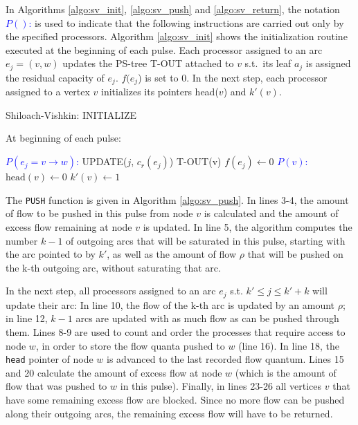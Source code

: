 \documentclass[a4paper,10pt, twocolumn]{article}
\begin{document}
In Algorithms \ref{algo:sv_init}, \ref{algo:sv_push} and \ref{algo:sv_return}, the notation \textcolor{blue}{$P()$:} is used to indicate that the following instructions are carried out only by the specified processors. Algorithm \ref{algo:sv_init} shows the initialization routine executed at the beginning of each pulse. Each processor assigned to an arc $e_j = (v, w)$ updates the PS-tree T-OUT attached to $v$ s.t.\ its leaf $a_j$ is assigned the residual capacity of $e_j$. $f(e_j$) is set to 0. In the next step, each processor assigned to a vertex $v$ initializes its pointers head($v$) and $k'(v)$.

\begin{algorithm}
\caption{Shiloach-Vishkin: INITIALIZE}
\label{algo:sv_init}
At beginning of each pulse:	
\begin{algorithmic}[1]
		\State \textcolor{blue}{$P(e_j = v \rightarrow w)$:}
		\State UPDATE($j$, $c_r(e_j)$) T-OUT(v)
		\State $f(e_j) \gets 0$
		\State \textcolor{blue}{$P(v)$:}
		\State $\mathrm{head}(v) \gets 0	$
		\State $k'(v) \gets 1$	
 	\EndFunction
\end{algorithmic}
\end{algorithm}

The \lstinline|PUSH| function is given in Algorithm \ref{algo:sv_push}. In lines 3-4, the amount of flow to be pushed in this pulse from node $v$ is calculated and the amount of excess flow remaining at node $v$ is updated. In line 5, the algorithm computes the number $k-1$ of outgoing arcs that will be saturated in this pulse, starting with the arc pointed to by $k'$, as well as the amount of flow $\rho$ that will be pushed on the k-th outgoing arc, without saturating that arc.

In the next step, all processors assigned to an arc $e_j$ s.t. $k'\leq j \leq k'+k$ will update their arc: In line 10, the flow of the k-th arc is updated by an amount $\rho$; in line 12, $k-1$ arcs are updated with as much flow as can be pushed through them. Lines 8-9 are used to count and order the processes that require access to node $w$, in order to store the flow quanta pushed to $w$ (line 16). In line 18, the \lstinline|head| pointer of node $w$ is advanced to the last recorded flow quantum. Lines 15 and 20 calculate the amount of excess flow at node $w$ (which is the amount of flow that was pushed to $w$ in this pulse). Finally, in lines 23-26 all vertices $v$ that have some remaining excess flow are blocked. Since no more flow can be pushed along their outgoing arcs, the remaining excess flow will have to be returned.
\end{document}
